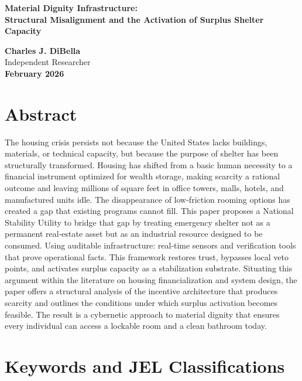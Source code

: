 \documentclass[
  12pt,
]{article}
\author{}
\date{}
\begin{document}
\renewcommand{\baselinestretch}{1.3}\normalsize
\begin{center} 
\vspace*{.3in} 

{\Large \textbf{Material Dignity Infrastructure:}} \\
{\large \textbf{Structural Misalignment and the Activation of Surplus Shelter Capacity}}

\vspace{1cm}
\textbf{Charles J. DiBella} \\
Independent Researcher \\
\textbf{February 2026}

\vspace{2cm}
\end{center}

\hypertarget{abstract}{%
\section{Abstract}\label{abstract}}

The housing crisis persists not because the United States lacks buildings, materials, or technical capacity, but because the purpose of shelter has been structurally transformed. Housing has shifted from a basic human necessity to a financial instrument optimized for wealth storage, making scarcity a rational outcome and leaving millions of square feet in office towers, malls, hotels, and manufactured units idle. The disappearance of low‑friction rooming options has created a gap that existing programs cannot fill. This paper proposes a National Stability Utility to bridge that gap by treating emergency shelter not as a permanent real‑estate asset but as an industrial resource designed to be consumed. Using auditable infrastructure: real‑time sensors and verification tools that prove operational facts. This framework restores trust, bypasses local veto points, and activates surplus capacity as a stabilization substrate. Situating this argument within the literature on housing financialization and system design, the paper offers a structural analysis of the incentive architecture that produces scarcity and outlines the conditions under which surplus activation becomes feasible. The result is a cybernetic approach to material dignity that ensures every individual can access a lockable room and a clean bathroom today.

\newpage

\hypertarget{keywords-and-jel-classifications}{%
\section{Keywords and JEL Classifications}\label{keywords-and-jel-classifications}}
\end{document}
